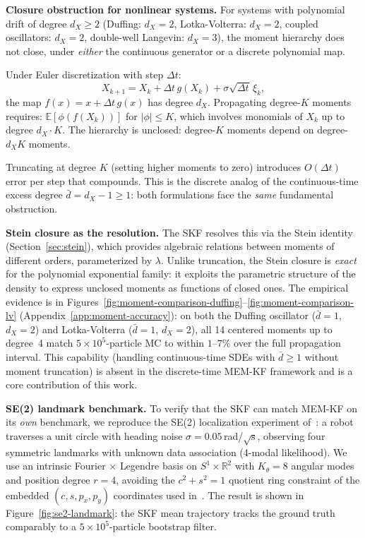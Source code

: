 \documentclass{article}
\newcommand{\R}{\mathbb{R}}
\newcommand{\E}{\mathbb{E}}
\theoremstyle{definition}
\begin{document}
\textbf{Closure obstruction for nonlinear systems.}
For systems with polynomial drift of degree $d_X \ge 2$
(Duffing: $d_X = 2$, Lotka-Volterra: $d_X = 2$,
coupled oscillators: $d_X = 2$, double-well Langevin: $d_X = 3$),
the moment hierarchy does not close, under
\emph{either} the continuous generator or a discrete polynomial map.

Under Euler discretization with step $\Delta t$:
\begin{equation}
    X_{k+1} = X_k + \Delta t\, g(X_k) + \sigma\sqrt{\Delta t}\,\xi_k,
\end{equation}
the map $f(x) = x + \Delta t\, g(x)$ has degree $d_X$.
Propagating degree-$K$ moments requires:
$\E[\phi(f(X_k))]$ for $|\phi| \le K$,
which involves monomials of $X_k$ up to degree $d_X \cdot K$.
The hierarchy is unclosed: degree-$K$ moments depend on
degree-$d_X K$ moments.

Truncating at degree $K$ (setting higher moments to zero)
introduces $O(\Delta t)$ error per step that compounds.
This is the discrete analog of the continuous-time excess degree
$\bar{d} = d_X - 1 \ge 1$: both formulations face the
\emph{same} fundamental obstruction.

\textbf{Stein closure as the resolution.}
The SKF resolves this via the Stein identity
(Section~\ref{sec:stein}), which provides algebraic relations
between moments of different orders, parameterized by $\lambda$.
Unlike truncation, the Stein closure is \emph{exact} for
the polynomial exponential family: it exploits the parametric
structure of the density to express unclosed moments as
functions of closed ones.
The empirical evidence is in
Figures~\ref{fig:moment-comparison-duffing}--\ref{fig:moment-comparison-lv}
(Appendix~\ref{app:moment-accuracy}):
on both the Duffing oscillator ($\bar{d} = 1$, $d_X = 2$)
and Lotka-Volterra ($\bar{d} = 1$, $d_X = 2$),
all 14 centered moments up to degree~4 match
$5 \times 10^5$-particle MC to within $1$--$7\%$
over the full propagation interval.
This capability (handling continuous-time SDEs with
$\bar{d} \ge 1$ without moment truncation) is absent
in the discrete-time MEM-KF framework and is a core
contribution of this work.

\textbf{SE(2) landmark benchmark.}
To verify that the SKF can match MEM-KF on its
\emph{own} benchmark, we reproduce the SE(2) localization
experiment of~\cite{teng2025}: a robot traverses a unit circle
with heading noise $\sigma = 0.05$\,rad/$\sqrt{\text{s}}$,
observing four symmetric landmarks with unknown data association
(4-modal likelihood).
We use an intrinsic Fourier$\,\times\,$Legendre basis on
$S^1 \times \R^2$ with $K_\theta = 8$ angular modes and
position degree $r = 4$, avoiding the
$c^2 + s^2 = 1$ quotient ring constraint of the embedded
$(c,s,p_x,p_y)$ coordinates used in~\cite{teng2025}.
The result is shown in Figure~\ref{fig:se2-landmark}:
the SKF mean trajectory tracks the ground truth comparably
to a $5 \times 10^5$-particle bootstrap filter.
\end{document}
